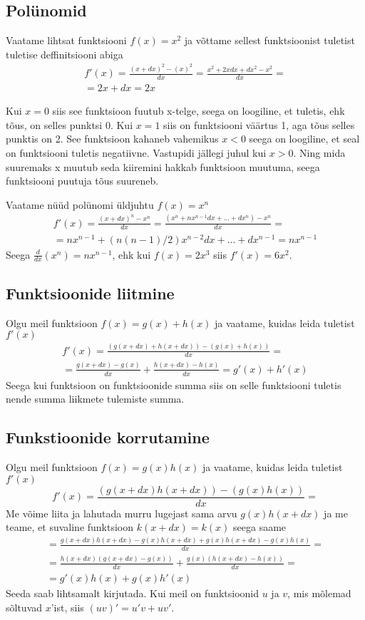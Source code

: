 \documentclass[a4paper,11pt,twocolumn]{article}
\begin{document}
\subsection{Polünomid}
Vaatame lihtsat funktsiooni $f(x) = x^2$ ja võttame sellest funktsioonist tuletist tuletise deffinitsiooni abiga
\begin{multline*}
f'(x) = \frac{(x+dx)^2-(x)^2}{dx} = \frac{x^2 + 2xdx + dx^2 - x^2}{dx} = \\
= 2x + dx = 2x
\end{multline*}

Kui $x=0$ siis see funktsioon fuutub x-telge, seega on loogiline, et tuletis, ehk tõus, on selles punktsi 0. Kui $x=1$ siis on funktsiooni väärtus 1, aga tõus selles punktis on 2. See funktsioon kahaneb vahemikus $x<0$ seega on loogiline, et seal on funktsiooni tuletis negatiivne. Vastupidi jällegi juhul kui $x>0$. Ning mida suuremaks x muutub seda kiiremini hakkab funktsioon muutuma, seega funktsiooni puutuja tõus suureneb.

Vaatame nüüd polünomi üldjuhtu $f(x) = x^n$
\begin{multline*}
f'(x) = \frac{(x+dx)^n-x^n}{dx} = \frac{(x^n+nx^{n-1}dx+...+dx^n)-x^n}{dx}= \\
=nx^{n-1}+(n(n-1)/2)x^{n-2}dx+...+dx^{n-1}= nx^{n-1}
\end{multline*}
Seega $\frac{d}{dx}(x^n)=nx^{n-1}$, ehk kui $f(x)=2x^3$ siis $f'(x)=6x^2$.

\subsection{Funktsioonide liitmine}
Olgu meil funktsioon $f(x) = g(x) + h(x)$ ja vaatame, kuidas leida tuletist $f'(x)$
\begin{multline*}
f'(x) = \frac{(g(x+dx)+h(x+dx))-(g(x)+h(x))}{dx} = \\
= \frac{g(x+dx) - g(x)}{dx} + \frac{h(x+dx) - h(x)}{dx} = g'(x) + h'(x)
\end{multline*}
Seega kui funktsioon on funktsioonide summa siis on selle funktsiooni tuletis nende summa liikmete tulemiste summa.

\subsection{Funkstioonide korrutamine}
Olgu meil funktsioon $f(x) = g(x)h(x)$ ja vaatame, kuidas leida tuletist $f'(x)$
\begin{equation*}
f'(x) = \frac{(g(x+dx)h(x+dx)) - (g(x)h(x))}{dx} = 
\end{equation*}
Me võime liita ja lahutada murru lugejast sama arvu $g(x)h(x+dx)$ ja me teame, et suvaline funktsioon $k(x+dx) = k(x)$ seega saame
\begin{multline*}
= \frac{g(x+dx)h(x+dx) - g(x)h(x+dx) + g(x)h(x+dx) - g(x)h(x)}{dx} = \\
= \frac{h(x+dx)(g(x+dx)-g(x))}{dx} + \frac{g(x)(h(x+dx)-h(x))}{dx} = \\
= g'(x)h(x) + g(x)h'(x)
\end{multline*}
Seeda saab lihtsamalt kirjutada. Kui meil on funktsioonid $u$ ja $v$, mis mõlemad sõltuvad $x$'ist, siis $(uv)' = u'v + uv'$.
\end{document}

